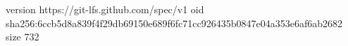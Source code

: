 version https://git-lfs.github.com/spec/v1
oid sha256:6ccb5d8a839f4f29db69150e689f6fc71cc926435b0847e04a353e6af6ab2682
size 732
